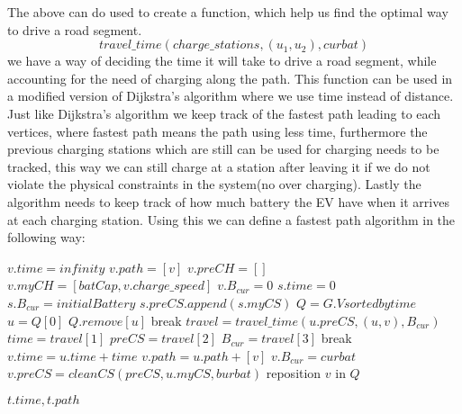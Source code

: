 The above can do used to create a function, which help us find the optimal way to drive a road segment. 
\[travel\_time(charge\_stations, (u_1, u_2), curbat) \]
we have a way of deciding the time it will take to drive a road segment, while accounting for the need of charging along the path. This function can be used in a modified version of Dijkstra's algorithm where we use time instead of distance. Just like Dijkstra's algorithm we keep track of the fastest path leading to each vertices, where fastest path means the path using less time, furthermore the previous charging stations which are still can be used for charging needs to be tracked, this way we can still charge at a station after leaving it if we do not violate the physical constraints in the system(no over charging). Lastly the algorithm needs to keep track of how much battery the EV have when it arrives at each charging station. Using this we can define a fastest path algorithm in the following way: 

\begin{algorithmic}
    		\State $v.time = infinity$
		\State $v.path = [v]$
    		\State $v.preCH = []$
		\State $v.myCH = [batCap, v.charge\_speed]$
		\State $v.B_{cur} = 0$
    	\EndFor
	\State $s.time = 0$
	\State $s.B_{cur} = initialBattery$
	\State $s.preCS.append(s.myCS)$	
	\State $Q = G.V sorted by time$
		\State $u = Q[0]$
		\State $Q.remove[u]$
		 break \EndIf
			\State $travel = travel\_time(u.preCS, (u, v), B_{cur})$
			\State $time = travel[1]$
			\State $preCS = travel[2]$
			\State $B_{cur} = travel[3]$
			 break \EndIf
				\State $v.time = u.time + time$
				\State $v.path = u.path + [v]$
				\State $v.B_{cur} = curbat$
				\State $v.preCS = cleanCS(preCS, u.myCS, burbat)$
				\State reposition $v$ in $Q$
			\EndIf

		\EndFor
	\EndWhile
	\State \Return $t.time, t.path$
\EndFunction
\end{algorithmic}\label{alg:fastest_path}
